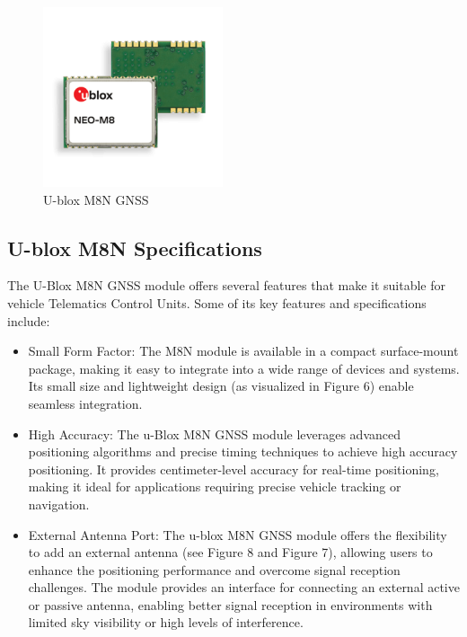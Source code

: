 \documentclass[
12pt,
oneside, 
onehalfspacing, 
nolistspacing, 
parskip, 
chapterinoneline, 
]{AASTCOMPUTER}
\begin{document}
\begin{figure}[!ht]
\centering
\includegraphics[scale=0.5]{Figures/11.png}
\caption[U-blox M8N GNSS]{U-blox M8N GNSS}
\label{fig:TCU}
\end{figure}

\subsection{U-blox M8N Specifications}
The U-Blox M8N GNSS module offers several features that make it suitable for vehicle Telematics Control Units. Some of its key features and specifications include:

\begin{itemize}
  \item Small Form Factor: The M8N module is available in a compact surface-mount package, making it easy to integrate into a wide range of devices and systems. Its small size and lightweight design (as visualized in Figure 6) enable seamless integration.
  \item High Accuracy: The u-Blox M8N GNSS module leverages advanced positioning algorithms and precise timing techniques to achieve high accuracy positioning. It provides centimeter-level accuracy for real-time positioning, making it ideal for applications requiring precise vehicle tracking or navigation.
  \item External Antenna Port: The u-blox M8N GNSS module offers the flexibility to add an external antenna (see Figure 8 and Figure 7), allowing users to enhance the positioning performance and overcome signal reception challenges. The module provides an interface for connecting an external active or passive antenna, enabling better signal reception in environments with limited sky visibility or high levels of interference.
\end{itemize}
\end{document}
